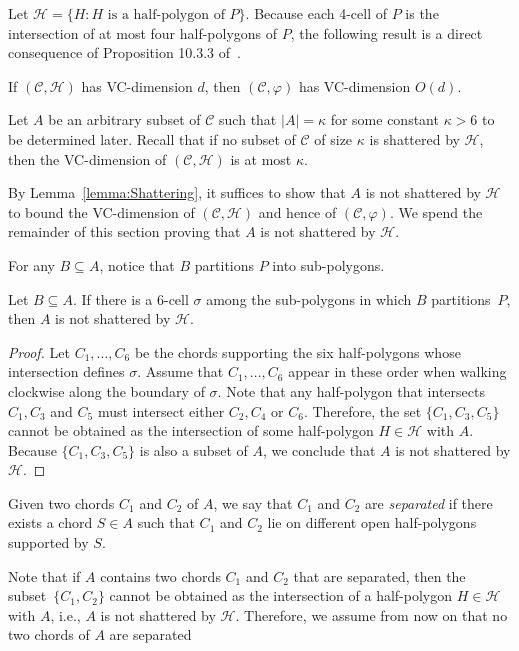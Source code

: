 \documentclass[a4paper,UKenglish]{lipics}
\newcommand{\tcell}{4-cell\xspace}
\begin{document}
Let $\mathcal H = \{H : H\text{ is a half-polygon of }P\}$.
Because each \tcell of $P$ is the intersection of at most four half-polygons of $P$,
the following result is a direct consequence of Proposition 10.3.3 of~\cite[Chapter 10]{matouvsek2002lectures}.

\begin{lemma}\label{lemma:Shattering}
If $(\mathcal C, \mathcal H)$ has VC-dimension $d$, then $(\mathcal C, \varphi)$ has VC-dimension $O(d)$.
\end{lemma}

Let $A$ be an arbitrary subset of $\mathcal C$ such that $|A| = \kappa$ for some constant $\kappa >6$ to be determined later.
Recall that if no subset of $\mathcal C$ of size $\kappa$ is shattered by $\mathcal H$, then the VC-dimension of $(\mathcal C, \mathcal H)$ is at most $\kappa$.

By Lemma~\ref{lemma:Shattering}, it suffices to show that $A$ is not shattered by $\mathcal H$ to bound the VC-dimension of $(\mathcal C, \mathcal H)$ and hence of $(\mathcal C, \varphi)$.
We spend the remainder of this section proving that $A$ is not shattered by $\mathcal H$.

For any $B\subseteq A$, notice that $B$ partitions $P$ into sub-polygons. 

\begin{lemma}\label{lemma:Hexagonal face}
Let $B\subseteq A$. 
If there is a $6$-cell $\sigma$ among the sub-polygons in which $B$ partitions~$P$,
then $A$ is not shattered by $\mathcal H$.
\end{lemma}
\begin{proof}
Let $C_1, \ldots, C_6$ be the chords supporting the six half-polygons whose intersection defines $\sigma$. Assume that $C_1, \ldots, C_6$ appear in these order when walking clockwise along the boundary of $\sigma$.
Note that any half-polygon that intersects $C_1, C_3$ and $C_5$ must intersect either $C_2, C_4$ or $C_6$. 
Therefore, the set $\{C_1, C_3, C_5\}$ cannot be obtained as the intersection of some half-polygon $H\in \mathcal H$ with $A$. 
Because $\{C_1, C_3, C_5\}$ is also a subset of $A$, 
we conclude that $A$ is not shattered by $\mathcal H$.
\end{proof}

Given two chords $C_1$ and $C_2$ of $A$, we say that $C_1$ and $C_2$ are \emph{separated} if there exists a chord $S\in A$ such that $C_1$ and $C_2$ lie on different open half-polygons supported by $S$.

Note that if $A$ contains two chords $C_1$ and $C_2$ that are separated, then the subset~$\{C_1, C_2\}$ cannot be obtained as the intersection of a half-polygon $H\in \mathcal H$ with $A$, i.e., $A$ is not shattered by $\mathcal H$. 
Therefore, we assume from now on that no two chords of $A$ are separated
\end{document}
